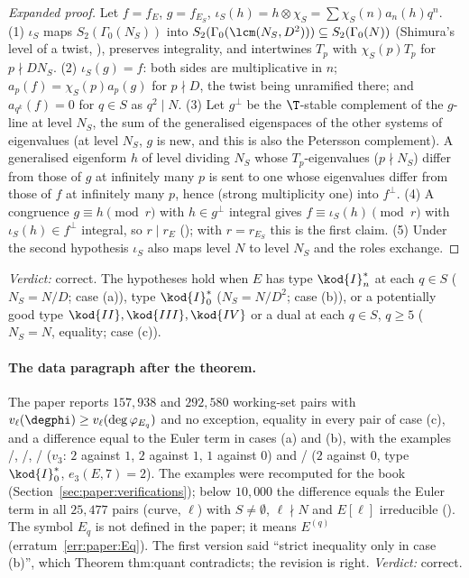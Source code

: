 \begin{sloppypar}
\begin{proof}[Expanded proof]
Let $f=f_E$, $g=f_{E_S}$, $\iota_S(h)=h\otimes\chi_S=\sum\chi_S(n)a_n(h)q^n$. (1) $\iota_S$ maps $S_2(\Gamma_0(N_S))$ into $S_2(\Gamma_0(\lcm(N_S,D^2)))\subseteq S_2(\Gamma_0(N))$ (Shimura's
level of a twist, ), preserves integrality, and intertwines $T_p$ with $\chi_S(p)T_p$ for $p\nmid DN_S$. (2) $\iota_S(g)=f$: both sides are multiplicative in $n$;
$a_p(f)=\chi_S(p)a_p(g)$ for $p\nmid D$, the twist being unramified there; and $a_{q^k}(f)=0$ for $q\in S$ as $q^2\mid N$. (3) Let $g^\perp$ be the $\T$-stable complement of the $g$-line at
level $N_S$, the sum of the generalised eigenspaces of the other systems of eigenvalues (at level $N_S$, $g$ is new, and this is also the Petersson complement). A
generalised eigenform $h$ of level dividing $N_S$ whose $T_p$-eigenvalues ($p\nmid N_S$) differ from those of $g$ at infinitely many $p$ is sent to one whose eigenvalues differ from
those of $f$ at infinitely many $p$, hence (strong multiplicity one) into $f^\perp$. (4) A congruence $g\equiv h\pmod r$ with $h\in g^\perp$ integral gives $f\equiv\iota_S(h)\pmod r$ with $\iota_S(h)\in f^\perp$
integral, so $r\mid r_E$ (); with $r=r_{E_S}$ this is the first claim. (5) Under the second hypothesis $\iota_S$ also maps level $N$ to level $N_S$ and the roles
exchange.
\end{proof}

\noindent\emph{Verdict:} correct. The hypotheses hold when $E$ has type $\kod{I}_n^*$ at each $q\in S$ ($N_S=N/D$; case (a)), type $\kod{I}_0^*$ ($N_S=N/D^2$; case (b)), or a potentially good type
$\kod{II},\kod{III},\kod{IV}$ or a dual at each $q\in S$, $q\ge5$ ($N_S=N$, equality; case (c)).

\paragraph{The data paragraph after the theorem.} The paper reports $157{,}938$ and $292{,}580$ working-set pairs with $v_\ell(\degphi)\ge v_\ell(\deg\varphi_{E_q})$ and no exception,
equality in every pair of case (c), and a difference equal to the Euler term in cases (a) and (b), with the examples /, /,
/ ($v_3$: $2$ against $1$, $2$ against $1$, $1$ against $0$) and / ($2$ against $0$, type $\kod{I}_0^*$, $e_3(E,7)=2$). The examples were recomputed
for the book (Section~\ref{sec:paper:verifications}); below $10{,}000$ the difference equals the Euler term in all $25{,}477$ pairs (curve, $\ell$) with $S\ne\emptyset$, $\ell\nmid N$ and $E[\ell]$
irreducible (). The symbol $E_q$ is not defined in the paper; it means $E^{(q)}$ (erratum~\ref{err:paper:Eq}). The first version said ``strict inequality only
in case (b)'', which Theorem thm:quant contradicts; the revision is right. \emph{Verdict:} correct.


\end{sloppypar}
